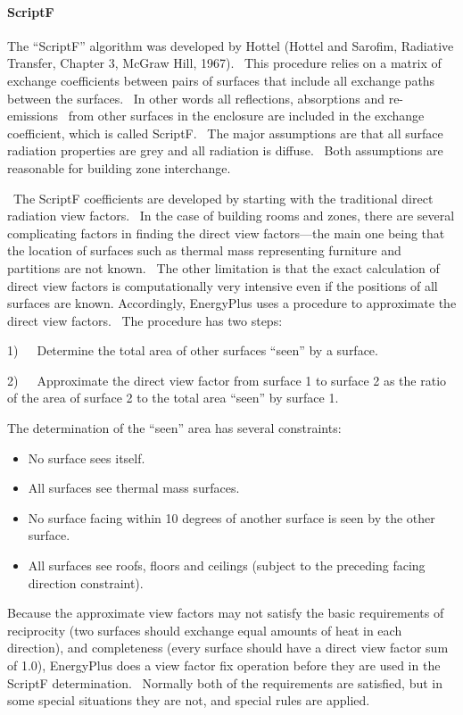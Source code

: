 \paragraph{ScriptF}

The ``ScriptF'' algorithm was developed by Hottel (Hottel and Sarofim, Radiative Transfer, Chapter 3, McGraw Hill, 1967).~ This procedure relies on a matrix of exchange coefficients between pairs of surfaces that include all exchange paths between the surfaces.~ In other words all reflections, absorptions and re-emissions~ from other surfaces in the enclosure are included in the exchange coefficient, which is called ScriptF.~ The major assumptions are that all surface radiation properties are grey and all radiation is diffuse.~ Both assumptions are reasonable for building zone interchange.

~The ScriptF coefficients are developed by starting with the traditional direct radiation view factors.~ In the case of building rooms and zones, there are several complicating factors in finding the direct view factors---the main one being that the location of surfaces such as thermal mass representing furniture and partitions are not known.~ The other limitation is that the exact calculation of direct view factors is computationally very intensive even if the positions of all surfaces are known. Accordingly, EnergyPlus uses a procedure to approximate the direct view factors.~ The procedure has two steps:

1)~~~Determine the total area of other surfaces ``seen'' by a surface.

2)~~~Approximate the direct view factor from surface 1 to surface 2 as the ratio of the area of surface 2 to the total area ``seen'' by surface 1.

The determination of the ``seen'' area has several constraints:

\begin{itemize}
\item
  No surface sees itself.
\item
  All surfaces see thermal mass surfaces.
\item
  No surface facing within 10 degrees of another surface is seen by the other surface.
\item
  All surfaces see roofs, floors and ceilings (subject to the preceding facing direction constraint).
\end{itemize}

Because the approximate view factors may not satisfy the basic requirements of reciprocity (two surfaces should exchange equal amounts of heat in each direction), and completeness (every surface should have a direct view factor sum of 1.0), EnergyPlus does a view factor fix operation before they are used in the ScriptF determination.~ Normally both of the requirements are satisfied, but in some special situations they are not, and special rules are applied.

